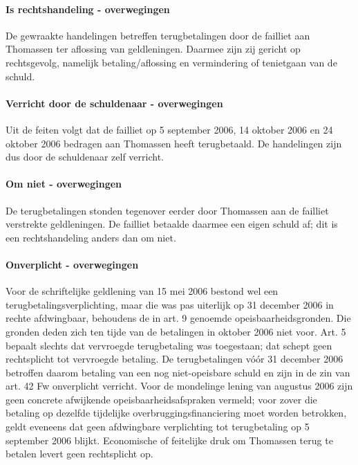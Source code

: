 \documentclass[
  dutch,
  a4paper,
]{article}
\begin{document}
\paragraph{Is rechtshandeling - overwegingen}\label{is-rechtshandeling---overwegingen-79}

De gewraakte handelingen betreffen terugbetalingen door de failliet aan Thomassen ter aflossing van geldleningen. Daarmee zijn zij gericht op rechtsgevolg, namelijk betaling/aflossing en vermindering of tenietgaan van de schuld.

\paragraph{Verricht door de schuldenaar - overwegingen}\label{verricht-door-de-schuldenaar---overwegingen-79}

Uit de feiten volgt dat de failliet op 5 september 2006, 14 oktober 2006 en 24 oktober 2006 bedragen aan Thomassen heeft terugbetaald. De handelingen zijn dus door de schuldenaar zelf verricht.

\paragraph{Om niet - overwegingen}\label{om-niet---overwegingen-79}

De terugbetalingen stonden tegenover eerder door Thomassen aan de failliet verstrekte geldleningen. De failliet betaalde daarmee een eigen schuld af; dit is een rechtshandeling anders dan om niet.

\paragraph{Onverplicht - overwegingen}\label{onverplicht---overwegingen-79}

Voor de schriftelijke geldlening van 15 mei 2006 bestond wel een terugbetalingsverplichting, maar die was pas uiterlijk op 31 december 2006 in rechte afdwingbaar, behoudens de in art. 9 genoemde opeisbaarheidsgronden. Die gronden deden zich ten tijde van de betalingen in oktober 2006 niet voor. Art. 5 bepaalt slechts dat vervroegde terugbetaling was toegestaan; dat schept geen rechtsplicht tot vervroegde betaling. De terugbetalingen vóór 31 december 2006 betroffen daarom betaling van een nog niet-opeisbare schuld en zijn in de zin van art. 42 Fw onverplicht verricht. Voor de mondelinge lening van augustus 2006 zijn geen concrete afwijkende opeisbaarheidsafspraken vermeld; voor zover die betaling op dezelfde tijdelijke overbruggingsfinanciering moet worden betrokken, geldt eveneens dat geen afdwingbare verplichting tot terugbetaling op 5 september 2006 blijkt. Economische of feitelijke druk om Thomassen terug te betalen levert geen rechtsplicht op.
\end{document}
